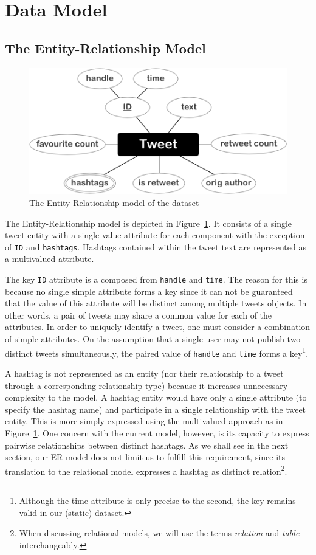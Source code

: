 \documentclass[a4paper, 12pt]{report}
\begin{document}
\newpage
\section{Data Model}
\subsection{The Entity-Relationship Model}
\label{sec:ermodel}

\begin{figure}[b]
  \centering\includegraphics[scale = 0.8]{ERModel.png}
  \caption{The Entity-Relationship model of the dataset}
  \label{fig:ermodel}
\end{figure}

The Entity-Relationship model is depicted in Figure~\ref{fig:ermodel}. It consists of a single tweet-entity with a single value attribute for each component with the exception of \texttt{ID} and \texttt{hashtags}. Hashtags contained within the tweet text are represented as a multivalued attribute.

The key \texttt{ID} attribute is a composed from \texttt{handle} and \texttt{time}. The reason for this is because no single simple attribute forms a key since it can not be guaranteed that the value of this attribute will be distinct among multiple tweets objects. In other words, a pair of tweets may share a common value for each of the attributes. In order to uniquely identify a tweet, one must consider a combination of simple attributes. On the assumption that a single user may not publish two distinct tweets simultaneously, the paired value of \texttt{handle} and \texttt{time} forms a key\footnote{Although the time attribute is only precise to the second, the key remains valid in our (static) dataset.}.

A hashtag is not represented as an entity (nor their relationship to a tweet through a corresponding relationship type) because it increases unnecessary complexity to the model. A hashtag entity would have only a single attribute (to specify the hashtag name) and participate in a single relationship with the tweet entity. This is more simply expressed using the multivalued approach as in Figure~\ref{fig:ermodel}. One concern with the current model, however, is its capacity to express pairwise relationships between distinct hashtags. As we shall see in the next section, our ER-model does not limit us to fulfill this requirement, since its translation to the relational model expresses a hashtag as distinct relation\footnote{When discussing relational models, we will use the terms \emph{relation} and \emph{table} interchangeably.}.
\end{document}
